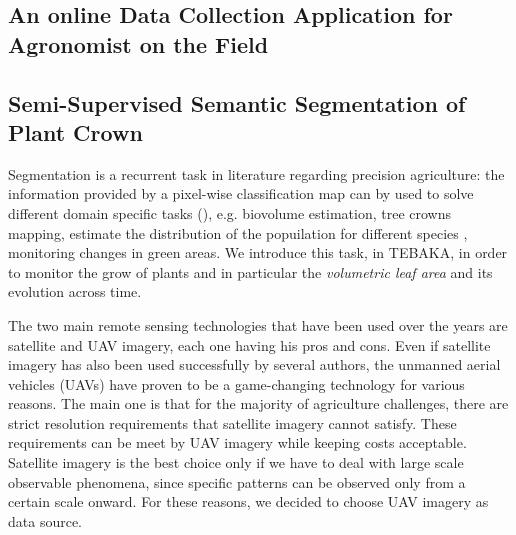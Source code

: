 \documentclass[comsoc,final]{IEEEtran}
\newcommand{\todo}[1]{\textcolor{red}{#1}}
\begin{document}
\subsection{An online Data Collection Application for Agronomist on the Field}\label{subsec:webapp}

\lipsum[2-3] %

\subsection{Semi-Supervised Semantic Segmentation of Plant Crown}\label{subsec:segmentation}

Segmentation is a recurrent task in literature regarding precision agriculture: the information provided by a pixel-wise classification map can by used to solve different domain specific tasks (\cite{s21051617,rs14061523,Egli20201}), e.g. biovolume estimation, tree crowns mapping, estimate the distribution of the popuilation for different species , monitoring changes in green areas. 
We introduce this task, in TEBAKA, in order to monitor the grow of
plants and in particular the \emph{volumetric leaf area} and its evolution across time.

The two main remote sensing technologies that have been used over the years are satellite and UAV imagery, each one having his pros and cons. Even if satellite imagery has also been used successfully by several authors\cite{ruswurm_multi-temporal_2018,daudt_fully_2018,ienco_land_2017},
the unmanned aerial vehicles (UAVs) have proven to be a game-changing technology for various reasons. The main one is that for the majority of agriculture challenges, there are strict resolution requirements that satellite imagery cannot satisfy. These requirements can be meet by UAV imagery while keeping costs acceptable. Satellite imagery is the best choice only if we have to deal with large scale observable phenomena\cite{gurumurthy_mango_2019,guirado_mask_2021}, since specific patterns can be observed only from a certain scale onward. For these reasons, we decided to choose UAV imagery as data source.
\end{document}

